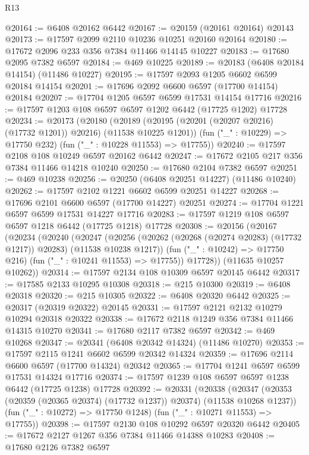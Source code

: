 \begin{lexlean}{R13}
\begin{coremodule}
@20164 := @6408 @20162 @6442
@20167 := @20159 (@20161 @20164) @20143
@20173 := @17597 @2099 @2110 @10236 @10251 @20160 @20164
@20180 := @17672 @2096 @233 @356 @7384 @11466 @14145 @10227
@20183 := @17680 @2095 @7382 @6597
@20184 := @469 @10225
@20189 := @20183 (@6408 @20184 @14154) (@11486 @10227)
@20195 := @17597 @2093 @1205 @6602 @6599 @20184 @14154
@20201 := @17696 @2092 @6600 @6597 (@17700 @14154) @20184
@20207 := @17704 @1205 @6597 @6599 @17531 @14154 @17716
@20216 := @17597 @1203 @108 @6597 @6597 @1202 @6442 (@17725 @1202) @17728
@20234 := @20173
    (@20180
      (@20189 (@20195 (@20201 (@20207 @20216) (@17732 @1201)) @20216) (@11538 @10225 @1201))
      (fun ("_" : @10229) => @17750 @232)
      (fun ("_" : @10228 @11553) => @17755))
@20240 := @17597 @2108 @108 @10249 @6597 @20162 @6442
@20247 := @17672 @2105 @217 @356 @7384 @11466 @14218 @10240
@20250 := @17680 @2104 @7382 @6597
@20251 := @469 @10238
@20256 := @20250 (@6408 @20251 @14227) (@11486 @10240)
@20262 := @17597 @2102 @1221 @6602 @6599 @20251 @14227
@20268 := @17696 @2101 @6600 @6597 (@17700 @14227) @20251
@20274 := @17704 @1221 @6597 @6599 @17531 @14227 @17716
@20283 := @17597 @1219 @108 @6597 @6597 @1218 @6442 (@17725 @1218) @17728
@20308 := @20156
    (@20167
      (@20234
        (@20240
          (@20247
            (@20256 (@20262 (@20268 (@20274 @20283) (@17732 @1217)) @20283) (@11538 @10238 @1217))
            (fun ("_" : @10242) => @17750 @216)
            (fun ("_" : @10241 @11553) => @17755))
          @17728))
      (@11635 @10257 @10262))
@20314 := @17597 @2134 @108 @10309 @6597 @20145 @6442
@20317 := @17585 @2133 @10295 @10308
@20318 := @215 @10300
@20319 := @6408 @20318
@20320 := @215 @10305
@20322 := @6408 @20320 @6442
@20325 := @20317 (@20319 @20322) @20145
@20331 := @17597 @2121 @2132 @10279 @10294 @20318 @20322
@20338 := @17672 @2118 @1249 @356 @7384 @11466 @14315 @10270
@20341 := @17680 @2117 @7382 @6597
@20342 := @469 @10268
@20347 := @20341 (@6408 @20342 @14324) (@11486 @10270)
@20353 := @17597 @2115 @1241 @6602 @6599 @20342 @14324
@20359 := @17696 @2114 @6600 @6597 (@17700 @14324) @20342
@20365 := @17704 @1241 @6597 @6599 @17531 @14324 @17716
@20374 := @17597 @1239 @108 @6597 @6597 @1238 @6442 (@17725 @1238) @17728
@20392 := @20331
    (@20338
      (@20347 (@20353 (@20359 (@20365 @20374) (@17732 @1237)) @20374) (@11538 @10268 @1237))
      (fun ("_" : @10272) => @17750 @1248)
      (fun ("_" : @10271 @11553) => @17755))
@20398 := @17597 @2130 @108 @10292 @6597 @20320 @6442
@20405 := @17672 @2127 @1267 @356 @7384 @11466 @14388 @10283
@20408 := @17680 @2126 @7382 @6597

\end{coremodule}
\end{lexlean}
